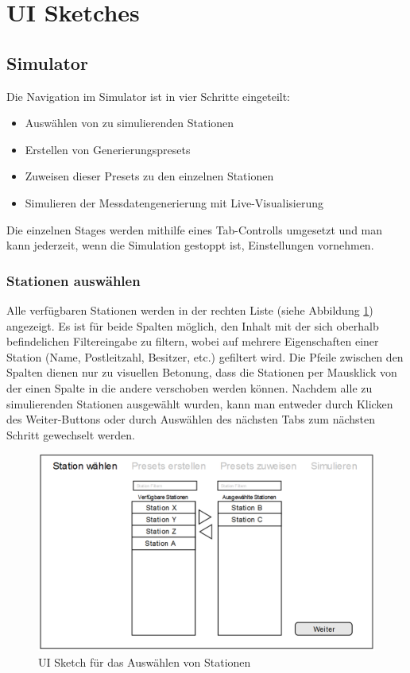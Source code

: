 \section{UI Sketches}
\setlength{\parindent}{0ex}
\subsection{Simulator}

Die Navigation im Simulator ist in vier Schritte eingeteilt:
\begin{itemize}
    \item Auswählen von zu simulierenden Stationen
    \item Erstellen von Generierungspresets
    \item Zuweisen dieser Presets zu den einzelnen Stationen
    \item Simulieren der Messdatengenerierung mit Live-Visualisierung
\end{itemize}

Die einzelnen Stages werden mithilfe eines Tab-Controlls umgesetzt und man kann jederzeit, wenn die Simulation gestoppt ist, Einstellungen vornehmen.

\subsubsection{Stationen auswählen}

Alle verfügbaren Stationen werden in der rechten Liste (siehe Abbildung \ref{fig:sketch_select_station}) angezeigt. Es ist für beide Spalten möglich, den Inhalt mit der sich oberhalb befindelichen Filtereingabe zu filtern, wobei auf mehrere Eigenschaften einer Station (Name, Postleitzahl, Besitzer, etc.) gefiltert wird. Die Pfeile zwischen den Spalten dienen nur zu visuellen Betonung, dass die Stationen per Mausklick von der einen Spalte in die andere verschoben werden können. Nachdem alle zu simulierenden Stationen ausgewählt wurden, kann man entweder durch Klicken des \grqq Weiter\glqq-Buttons oder durch Auswählen des nächsten Tabs zum nächsten Schritt gewechselt werden.

\begin{figure}[H]
\centering
\includegraphics[width=1\textwidth]{pictures/sketches/simulator/select_sataion.png}
\caption{UI Sketch für das Auswählen von Stationen}
\label{fig:sketch_select_station}
\end{figure}
\raggedright

